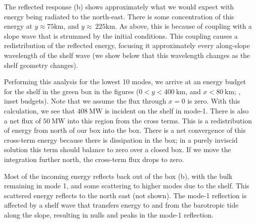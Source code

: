 \documentclass[10pt]{article}
\begin{document}
The reflected response (b) shows approximately what we would expect with energy being radiated to the north-east.  There is some concentration of this energy at $y\approx \mathrm{75 km}$, and  $y\approx\ \mathrm{225 km}$. As above, this is because of coupling with a slope wave that is strummed by the initial conditions.   This coupling causes a redistribution of the reflected energy, focusing it approximately every along-slope wavelength of the shelf wave (we show below that this wavelength changes as the shelf geometry changes).  

Performing this analysis for the lowest 10 modes, we arrive at an energy budget for the shelf in the green box in the figures ($0<y<400\ \mathrm{km}$, and $x<80\ \mathrm{km}$; , inset budgets).   Note that we assume the flux through $x=0$ is zero.   With this calculation, we see that $408\ \mathrm{MW}$ is incident on the shelf in mode-1.  There is also a net flux  of $50\ \mathrm{MW}$ into this region from the cross terms.  This is a redistribution of energy from north of our box into the box.  There is a net convergence of this cross-term energy because there is dissipation in the box; in a purely inviscid solution this term should balance to zero over a closed box.  If we move the integration further north, the cross-term flux drops to zero.  

Most of the incoming energy reflects back out of the box (b), with the bulk remaining in mode 1, and  some scattering to higher modes due to the shelf.  This scattered energy reflects to the north east (not shown).  The mode-1 reflection is affected by a shelf wave that transfers energy to and from the barotropic tide along the slope, resulting in nulls and peaks in the mode-1 reflection.  
\end{document}
